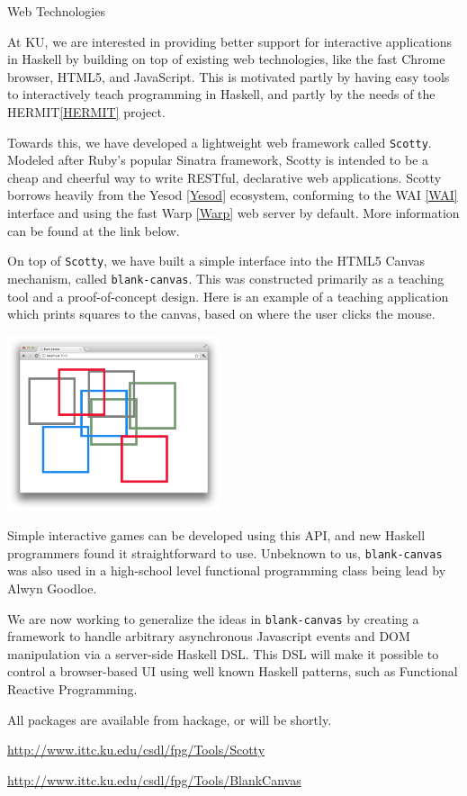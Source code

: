 \begin{hcarentry}{Web Technologies}
\label{kuwebtech}
\makeheader

At KU, we are interested in providing better support for
interactive applications in Haskell by building on top of existing web technologies,
like the fast Chrome browser, HTML5, and JavaScript. This is motivated
partly by having easy tools to interactively teach programming in Haskell,
and partly by the needs of the HERMIT\cref{HERMIT} project.

Towards this, we have developed a lightweight web framework called {\tt Scotty}.
Modeled after Ruby's popular Sinatra framework, Scotty is intended to
be a cheap and cheerful way to write RESTful, declarative web applications.
Scotty borrows heavily from the Yesod \cref{Yesod} ecosystem, conforming
to the WAI \cref{WAI} interface and using the fast Warp \cref{Warp} web server
by default. More information can be found at the link below.

On top of {\tt Scotty}, we have built a simple interface
into the HTML5 Canvas mechanism, called {\tt blank-canvas}.
This was constructed primarily as a teaching tool and
a proof-of-concept design. Here is an example of
a teaching application which prints squares to the canvas,
based on where the user clicks the mouse.

\includegraphics[width=0.47\textwidth]{html/squares.png}

Simple interactive games can be developed using this API,
and new Haskell programmers found it straightforward to use.
Unbeknown to us, {\tt blank-canvas} was also used in a high-school
level functional programming class being lead by Alwyn Goodloe.

We are now working to generalize the ideas in {\tt blank-canvas} by
creating a framework to handle arbitrary asynchronous Javascript events
and DOM manipulation via a server-side Haskell DSL. This DSL will make it possible to control
a browser-based UI using well known Haskell patterns, such as Functional
Reactive Programming.

All packages are available from hackage, or will be shortly.

\FurtherReading
\begin{compactitem}
  \item \url{http://www.ittc.ku.edu/csdl/fpg/Tools/Scotty}
  \item \url{http://www.ittc.ku.edu/csdl/fpg/Tools/BlankCanvas}
\end{compactitem}

\end{hcarentry}
